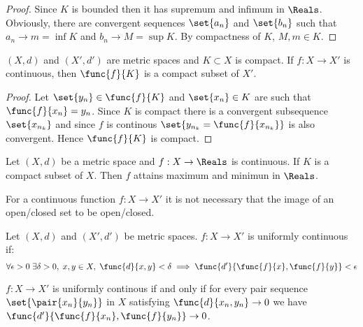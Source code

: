 \begin{proof}
    Since \(K\) is bounded then it has supremum and infimum in \(\Reals\). Obviously, there are convergent sequences \(\set{a_n}\) and \(\set{b_n}\) such that \(a_n \to m = \inf K\) and \(b_n \to M = \sup K\). By compactness of \(K\), \(M,m \in K\).
\end{proof}

\begin{theorem}
    \((X,d)\) and \((X',d')\) are metric spaces and \(K \subset X\) is compact. If \(f : X \to X'\) is continuous, then \(\func{f}{K}\) is a compact subset of \(X'\).
\end{theorem}

\begin{proof}
    Let \(\set{y_n} \in \func{f}{K}\) and \(\set{x_n} \in K\) are such that \(\func{f}{x_n} = y_n\). Since \(K\) is compact there is a convergent subsequence \(\set{x_{n_k}}\) and since \(f\) is continous \( \set{ y_{n_k} = \func{f}{x_{n_k}}}\) is also convergent. Hence \(\func{f}{K}\) is compact.
\end{proof}

\begin{corollary}
    Let \((X,d)\) be a metric space and \(f : X \to \Reals\) is continuous. If \(K\) is a compact subset of \(X\). Then \(f\) attains maximum and minimun in \(\Reals\).
\end{corollary}

\begin{note}
    For a continuous function \(f : X \to X'\) it is not necessary that the image of an open/closed set to be open/closed.
\end{note}

\begin{definition} 
    Let \((X,d)\) and \((X',d')\) be metric spaces.  \(f :X \to X'\) is uniformly continuous if:
    \begin{equation*}
        \forall \epsilon > 0\; \exists \delta > 0, \; x,y \in X, \; \func{d}{x,y} < \delta \implies \func{d'}{\func{f}{x},\func{f}{y}} < \epsilon
    \end{equation*}
\end{definition}

\begin{proposition}
    \(f: X \to X'\) is uniformly continous if and only if for every pair sequence \(\set{\pair{x_n}{y_n}}\) in \(X\) satisfying \(\func{d}{x_n,y_n} \to 0\) we have \(\func{d'}{\func{f}{x_n}, \func{f}{y_n}} \to 0\).
\end{proposition}

